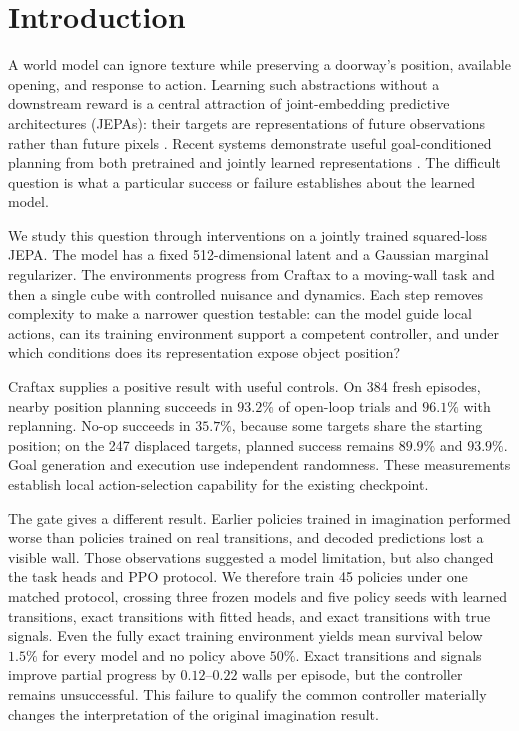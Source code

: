 \section{Introduction}
\label{sec:intro}

A world model can ignore texture while preserving a doorway's position, available opening, and
response to action. Learning such abstractions without a downstream reward is a central attraction
of joint-embedding predictive architectures (JEPAs): their targets are representations of future
observations rather than future pixels \citep{lecun2022path,assran2023ijepa,bardes2024vjepa}.
Recent systems demonstrate useful goal-conditioned planning from both pretrained and jointly
learned representations \citep{assran2025vjepa2,sobal2025pldm,maes2026lewm}. The difficult question
is what a particular success or failure establishes about the learned model.

We study this question through interventions on a jointly trained squared-loss JEPA. The model has
a fixed 512-dimensional latent and a Gaussian marginal regularizer. The environments progress from
Craftax to a moving-wall task and then a single cube with controlled nuisance and dynamics. Each
step removes complexity to make a narrower question testable: can the model guide local actions,
can its training environment support a competent controller, and under which conditions does its
representation expose object position?

Craftax supplies a positive result with useful controls. On 384 fresh episodes, nearby position
planning succeeds in $93.2\%$ of open-loop trials and $96.1\%$ with replanning. No-op succeeds in
$35.7\%$, because some targets share the starting position; on the 247 displaced targets, planned
success remains $89.9\%$ and $93.9\%$. Goal generation and execution use independent randomness.
These measurements establish local action-selection capability for the existing checkpoint.

The gate gives a different result. Earlier policies trained in imagination performed worse than
policies trained on real transitions, and decoded predictions lost a visible wall. Those observations
suggested a model limitation, but also changed the task heads and PPO protocol. We therefore train
45 policies under one matched protocol, crossing three frozen models and five policy seeds with
learned transitions, exact transitions with fitted heads, and exact transitions with true signals.
Even the fully exact training environment yields mean survival below $1.5\%$ for every model and
no policy above $50\%$. Exact transitions and signals improve partial progress by $0.12$--$0.22$
walls per episode, but the controller remains unsuccessful. This failure to qualify the common
controller materially changes the interpretation of the original imagination result.

